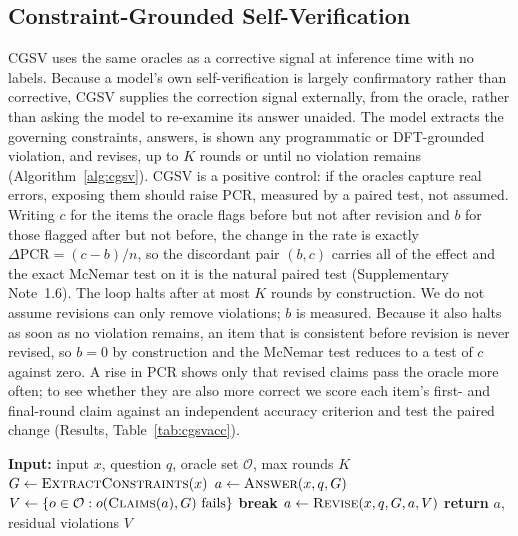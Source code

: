 \documentclass[pdflatex,sn-nature]{sn-jnl}
\newcommand{\rev}[1]{#1} %
\newcommand{\rev}[1]{{\color{blue}#1}} %
\providecommand{\DIFadd}[1]{{\protect\color{blue} \sf #1}} %
\providecommand{\DIFdel}[1]{{\protect\color{red} \scriptsize #1}} %
\providecommand{\DIFaddbegin}{} %
\providecommand{\DIFaddend}{} %
\providecommand{\DIFdelbegin}{} %
\providecommand{\DIFdelend}{} %
\providecommand{\DIFscaledelfig}{0.5}
\newlength{\DIFdelgraphicswidth} %
\newlength{\DIFdelgraphicsheight} %
\providecommand{\DIFaddincludegraphics}[2][]{{\color{blue}\fbox{\DIFOincludegraphics[#1]{#2}}}} %
\providecommand{\DIFdelincludegraphics}[2][]{%
\sbox{\DIFdelgraphicsbox}{\DIFOincludegraphics[#1]{#2}}%
\settoboxwidth{\DIFdelgraphicswidth}{\DIFdelgraphicsbox} %
\settoboxtotalheight{\DIFdelgraphicsheight}{\DIFdelgraphicsbox} %
\scalebox{\DIFscaledelfig}{%
\parbox[b]{\DIFdelgraphicswidth}{\usebox{\DIFdelgraphicsbox}\\[-\baselineskip] \rule{\DIFdelgraphicswidth}{0em}}\llap{\resizebox{\DIFdelgraphicswidth}{\DIFdelgraphicsheight}{%
\setlength{\unitlength}{\DIFdelgraphicswidth}%
\begin{picture}(1,1)%
\thicklines\linethickness{2pt} %
{\color[rgb]{1,0,0}\put(0,0){\framebox(1,1){}}}%
{\color[rgb]{1,0,0}\put(0,0){\line( 1,1){1}}}%
{\color[rgb]{1,0,0}\put(0,1){\line(1,-1){1}}}%
\end{picture}%
}\hspace*{3pt}}} %
} %
\DeclareRobustCommand{\DIFaddbegin}{\DIFOaddbegin \let\includegraphics\DIFaddincludegraphics} %
\DeclareRobustCommand{\DIFaddend}{\DIFOaddend \let\includegraphics\DIFOincludegraphics} %
\DeclareRobustCommand{\DIFdelbegin}{\DIFOdelbegin \let\includegraphics\DIFdelincludegraphics} %
\DeclareRobustCommand{\DIFdelend}{\DIFOaddend \let\includegraphics\DIFOincludegraphics} %
\begin{document}
\subsection*{Constraint-Grounded Self-Verification}
CGSV uses the same oracles as a corrective signal at inference time with no labels.
Because a model's own self-verification is largely confirmatory rather than
corrective,\cite{selfverify2026} CGSV supplies the correction signal externally, from the
oracle, rather than asking the model to re-examine its answer unaided. The model extracts
the governing constraints, answers, is shown any programmatic or DFT-grounded violation,
and revises, up to $K$ rounds or until no violation remains (Algorithm~\ref{alg:cgsv}).
CGSV is a positive control: if the oracles capture real errors, exposing them should raise
PCR, measured by a paired test, not assumed. Writing $c$ for the items the oracle flags
before but not after revision and $b$ for those flagged after but not before, the change in
the rate is exactly $\Delta\mathrm{PCR}=(c-b)/n$, so the discordant pair $(b,c)$ carries all
of the effect and the exact McNemar test on it is the natural paired test
(Supplementary Note~1.6). The loop halts after at most $K$ rounds by construction. \DIFdelbegin \DIFdel{We do not
assume revisions can only remove violations; $b$ is measured.
}\DIFdelend \DIFaddbegin \DIFadd{\rev{Because it
also halts as soon as no violation remains, an item that is consistent before revision is never
revised, so $b=0$ by construction and the McNemar test reduces to a test of $c$ against zero. A rise
in PCR shows only that revised claims pass the oracle more often; to see whether they are also more
correct we score each item's first- and final-round claim against an independent accuracy criterion
and test the paired change (Results, Table~\ref{tab:cgsvacc}).}
}\DIFaddend 

\begin{algorithm}[t]
\caption{Constraint-Grounded Self-Verification}
\label{alg:cgsv}
\begin{algorithmic}[1]
\State \textbf{Input:} input $x$, question $q$, oracle set $\mathcal{O}$, max rounds $K$
\State $G \gets \textsc{ExtractConstraints}(x)$
\State $a \gets \textsc{Answer}(x,q,G)$
  \State $V \gets \{o \in \mathcal{O} : o(\textsc{Claims}(a), G)\ \text{fails}\}$
   \State \textbf{break} \EndIf
  \State $a \gets \textsc{Revise}(x, q, G, a, V)$
\EndFor
\State \textbf{return} $a$, residual violations $V$
\end{algorithmic}
\end{algorithm}
\end{document}
